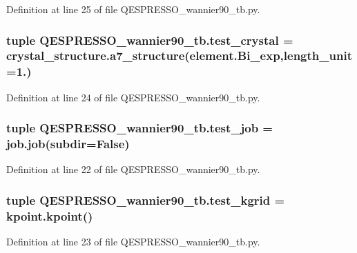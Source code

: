 Definition at line 25 of file Q\+E\+S\+P\+R\+E\+S\+S\+O\+\_\+wannier90\+\_\+tb.\+py.

\hypertarget{namespace_q_e_s_p_r_e_s_s_o__wannier90__tb_a09787f9a7d53d0b6f2fc765d588c4404}{
\subsubsection[{test\+\_\+crystal}]{\setlength{\rightskip}{0pt plus 5cm}tuple Q\+E\+S\+P\+R\+E\+S\+S\+O\+\_\+wannier90\+\_\+tb.\+test\+\_\+crystal = crystal\+\_\+structure.\+a7\+\_\+structure(element.\+Bi\+\_\+exp,length\+\_\+unit=1.)}}\label{namespace_q_e_s_p_r_e_s_s_o__wannier90__tb_a09787f9a7d53d0b6f2fc765d588c4404}


Definition at line 24 of file Q\+E\+S\+P\+R\+E\+S\+S\+O\+\_\+wannier90\+\_\+tb.\+py.

\hypertarget{namespace_q_e_s_p_r_e_s_s_o__wannier90__tb_ac1b80886a2288bbe3449f32f5f1cac0f}{
\subsubsection[{test\+\_\+job}]{\setlength{\rightskip}{0pt plus 5cm}tuple Q\+E\+S\+P\+R\+E\+S\+S\+O\+\_\+wannier90\+\_\+tb.\+test\+\_\+job = job.\+job(subdir=False)}}\label{namespace_q_e_s_p_r_e_s_s_o__wannier90__tb_ac1b80886a2288bbe3449f32f5f1cac0f}


Definition at line 22 of file Q\+E\+S\+P\+R\+E\+S\+S\+O\+\_\+wannier90\+\_\+tb.\+py.

\hypertarget{namespace_q_e_s_p_r_e_s_s_o__wannier90__tb_a793d6d59e699975981e93f16fa752d91}{
\subsubsection[{test\+\_\+kgrid}]{\setlength{\rightskip}{0pt plus 5cm}tuple Q\+E\+S\+P\+R\+E\+S\+S\+O\+\_\+wannier90\+\_\+tb.\+test\+\_\+kgrid = kpoint.\+kpoint()}}\label{namespace_q_e_s_p_r_e_s_s_o__wannier90__tb_a793d6d59e699975981e93f16fa752d91}


Definition at line 23 of file Q\+E\+S\+P\+R\+E\+S\+S\+O\+\_\+wannier90\+\_\+tb.\+py.

